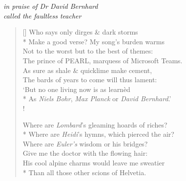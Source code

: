 \begin{center}
\textit{in praise of Dr David Bernhard}\\
\textit{called the faultless teacher}
\end{center}

\bigskip

\settowidth{\versewidth}{His cool alpine charms would leave me sweatier}
\begin{verse}[\versewidth]
Who says only dirges \& dark storms\\*
Make a good verse? My song's burden warms\\
Not to the worst but to the best of themes:\\
The prince of PEARL, marquess of Microsoft Teams.\\
As sure as shale \& quicklime make cement,\\
The bards of years to come will thus lament:\\
`But no one living now is  as learn\`ed\\*
As \textit{Niels Bohr}, \textit{Max Planck} or \textit{David Bernhard}.'\\!

Where are \textit{Lombard}'s gleaming hoards of riches?\\*
\vin Where are \textit{Heidi}'s hymns, which pierced the air?\\
Where are \textit{Euler's} wisdom or his bridges?\\
\vin Give me the doctor with the flowing hair:\\
His cool alpine charms would leave me sweatier\\*
Than all those other scions of Helvetia.
\end{verse}
